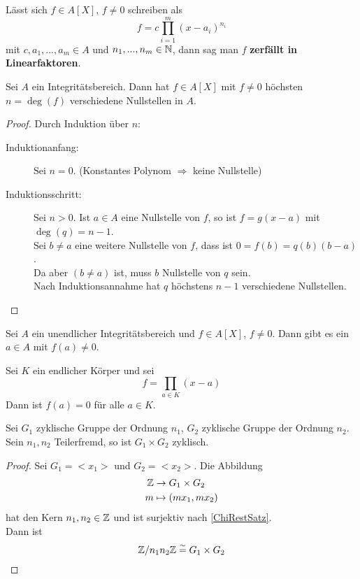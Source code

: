 	\begin{definition}
		Lässt sich $f\in A[X]$, $f\neq 0$ schreiben als
		\[f=c\prod_{i=1}^{m}(x-a_i)^{n_i}\]
		mit $c,a_1,...,a_m\in A$ und $n_1,...,n_m\in\mathbb{N}$, dann sag man $f$ \textbf{zerfällt in Linearfaktoren}.
	\end{definition}

	\begin{satz}\label{satz:polyNst}
		Sei $A$ ein Integritätsbereich. Dann hat $f\in A[X]$ mit $f\neq 0$ höchsten $n=\deg(f)$ verschiedene Nullstellen in $A$.
	\end{satz}
	\begin{proof}
		Durch Induktion über $n$:
		\begin{description}
			\item[Induktionanfang:] Sei $n=0$. (Konstantes Polynom $\Rightarrow$ keine Nullstelle)
			\item[Induktionsschritt:] Sei $n>0$. Ist $a\in A$ eine Nullstelle von $f$, so ist $f=g(x-a)$ mit $\deg(q)=n-1$.\\
			Sei $b\neq a$ eine weitere Nullstelle von $f$, dass ist $0=f(b)=q(b)(b-a)$.\\
			Da aber $(b\neq a)$ ist, muss $b$ Nullstelle von $q$ sein.\\
			Nach Induktionsannahme hat $q$ höchstens $n-1$ verschiedene Nullstellen.
		\end{description}
	\end{proof}

	\begin{kor}
		Sei $A$ ein unendlicher Integritätsbereich und $f\in A[X]$, $f\neq0$. Dann gibt es ein $a\in A$ mit $f(a)\neq 0$.
	\end{kor}

	\begin{exm}
		Sei $K$ ein endlicher Körper und sei
		\[f=\prod_{a\in K}(x-a)\]
		Dann ist $f(a)=0$ für alle $a\in K$.
	\end{exm}

	\begin{satz}
		Sei $G_1$ zyklische Gruppe der Ordnung $n_1$, $G_2$ zyklische Gruppe der Ordnung $n_2$.\\
		Sein $n_1,n_2$ Teilerfremd, so ist $G_1\times G_2$ zyklisch.
	\end{satz}

	\begin{proof}
		Sei $G_1=<x_1>$ und $G_2=<x_2>$. Die Abbildung
		\begin{align*}
		\mathbb{Z}&\to G_1\times G_2\\
		m&\mapsto (mx_1,mx_2)
		\end{align*}
		hat den Kern $n_1,n_2\in\mathbb{Z}$ und ist surjektiv nach \ref{ChiRestSatz}.\\
		Dann ist
		\[\mathbb{Z}/n_1n_2\mathbb{Z}\overset{\sim}{=} G_1\times G_2\] 
	\end{proof}

